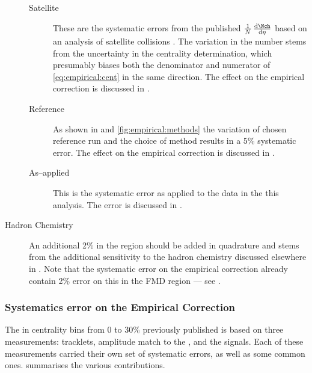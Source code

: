 \begin{description}
\begin{description}
  \item[Satellite] These are the systematic errors from the published
    $\ndndeta$ based on an analysis of satellite collisions
    \cite{Abbas:2013bpa}.  The variation in the number stems from the
    uncertainty in the centrality determination, which presumably
    biases both the denominator and numerator of
    \eqref{eq:empirical:cent} in the same direction. The effect on the
    empirical correction is discussed in . 
  \item[Reference] As shown in  and
    \ref{fig:empirical:methods} the variation of chosen reference run
    and the choice of method results in a 5\% systematic error. The
    effect on the empirical correction is discussed in
    .
  \item[As--applied] This is the systematic error as applied to the
    data in the this analysis. The error is discussed in
    .
  \end{description}
\item[Hadron Chemistry] An additional 2\% in the  region should
  be added in quadrature and stems from the additional sensitivity to
  the hadron chemistry discussed elsewhere in
  . Note that the systematic error on the
  empirical correction already contain 2\% error on this in the FMD
  region --- see .
\end{description}

\subsubsection{Systematics error on the Empirical Correction} 
\label{sec:dndeta:sys:emp}

The \ndndeta{} in centrality bins from 0 to 30\% previously published
\cite{Abbas:2013bpa} is based on three measurements: \SPD{} tracklets,
\VZERO{} amplitude match to the \SPD{}, and the \FMD{} signals.  Each
of these measurements carried their own set of systematic errors, as
well as some common ones.  summarises
the various contributions. 

